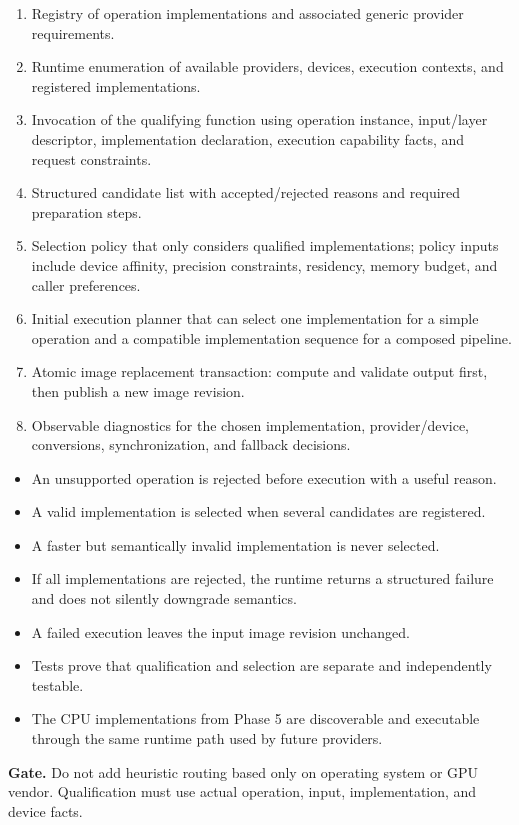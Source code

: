 \deliverables
\begin{enumerate}
  \item Registry of operation implementations and associated generic provider requirements.
  \item Runtime enumeration of available providers, devices, execution contexts, and registered implementations.
  \item Invocation of the \IPP{} qualifying function using operation instance, input/layer descriptor, implementation declaration, execution capability facts, and request constraints.
  \item Structured candidate list with accepted/rejected reasons and required preparation steps.
  \item Selection policy that only considers qualified implementations; policy inputs include device affinity, precision constraints, residency, memory budget, and caller preferences.
  \item Initial execution planner that can select one implementation for a simple operation and a compatible implementation sequence for a composed pipeline.
  \item Atomic image replacement transaction: compute and validate output first, then publish a new image revision.
  \item Observable diagnostics for the chosen implementation, provider/device, conversions, synchronization, and fallback decisions.
\end{enumerate}

\exitcriteria
\begin{itemize}
  \item An unsupported operation is rejected before execution with a useful reason.
  \item A valid implementation is selected when several candidates are registered.
  \item A faster but semantically invalid implementation is never selected.
  \item If all implementations are rejected, the runtime returns a structured failure and does not silently downgrade semantics.
  \item A failed execution leaves the input image revision unchanged.
  \item Tests prove that qualification and selection are separate and independently testable.
  \item The CPU implementations from Phase 5 are discoverable and executable through the same runtime path used by future providers.
\end{itemize}

\textbf{Gate.} Do not add heuristic routing based only on operating system or GPU vendor. Qualification must use actual operation, input, implementation, and device facts.
